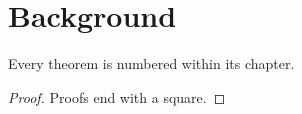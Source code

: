 \chapter{Background}
\label{ch:background}

\begin{theorem}
  Every theorem is numbered within its chapter.
\end{theorem}
\begin{proof}
  Proofs end with a square.
\end{proof}
